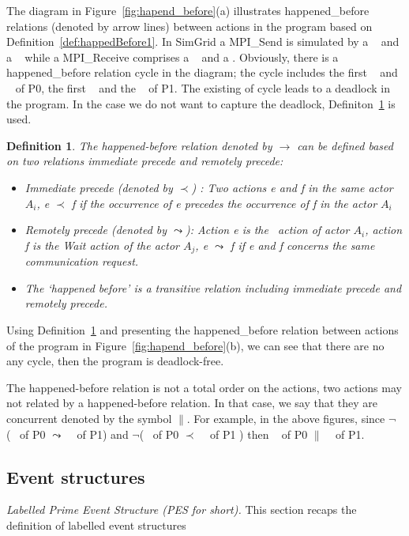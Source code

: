 \documentclass[a4paper,11pt]{article}
\theoremstyle{break}
\newtheorem{definition}{Definition}
\begin{document}
The diagram in Figure~\ref{fig:hapend_before}(a) illustrates happened\_before relations (denoted by arrow lines) between actions in the program based on Definition~\ref{def:happedBefore1}. In SimGrid a MPI\_Send is simulated by a \asynsend~ and a \wait~ while a MPI\_Receive comprises a \asynreceive~ and a \wait. Obviously, there is a happened\_before relation cycle in the diagram; the cycle includes the first \wait~ and \asynreceive~ of P0, the first \wait~ and the \asynreceive~ of P1. The existing of cycle leads to a deadlock in the program. In the case we do not want to capture the deadlock, Definiton~\ref{def:happedBefore2} is used.

\begin{definition}
  	\label{def:happedBefore2}
  The happened-before relation  denoted by  $\rightarrow $ can be defined based on two relations immediate precede and remotely precede: \begin{itemize}
  	\item Immediate precede (denoted by $ \prec$) :  Two actions e and f in the same actor $A_i$, e $ \prec$ f if the occurrence of e precedes the occurrence of f in the actor $A_i$  
  	\item Remotely precede (denoted by $\leadsto$): Action e is the \asynsend~action of actor $A_i$, action f is the Wait action of the actor $A_j$,  e $\leadsto$ f if e and f concerns the same communication request.
  \item The ‘happened before’ is a transitive relation including immediate precede and remotely precede.
  \end{itemize}\end{definition} 

Using Definition~\ref{def:happedBefore2} and presenting the happened\_before relation between actions of the program in Figure~\ref{fig:hapend_before}(b), we can see that there are no any cycle, then the program is deadlock-free.

The happened-before relation is not a total order on the actions, two actions may not related by a happened-before relation. In that case, we say that they are concurrent denoted by the symbol $\parallel$. For example, in the above figures, since $\neg$(\asynsend~ of P0 $\leadsto$ \asynsend~ of P1) and $\neg$(\asynsend~ of P0 $ \prec$  \asynsend~ of P1 ) then \asynsend~ of P0 $\parallel$ \asynsend~ of P1.  
\subsection{Event structures}
\textit{Labelled Prime Event Structure (PES for short).} This section recaps the definition of labelled event structures~\cite{DBLP:conf/concur/RodriguezSSK15}
\end{document}
